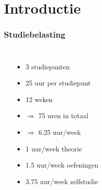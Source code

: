 \section{Introductie}

\frame{ \tableofcontents[currentsection] }

\begin{frame}
  \frametitle{Studiebelasting}
  \begin{columns}
    \begin{center}
    \end{center}
      \begin{itemize}
        \item<1-> 3 studiepunten
        \item<1-> 25 uur per studiepunt
        \item<1-> 12 weken
        \item<1-> $\Rightarrow$ 75 uren in totaal
        \item<1-> $\Rightarrow$ 6.25 uur/week
        \item<2-> {\color{red} 1 uur/week theorie}
        \item<3-> {\color{blue} 1.5 uur/week oefeningen}
        \item<4-> {\color{green} 3.75 uur/week zelfstudie}
      \end{itemize}
  \end{columns}
\end{frame}

